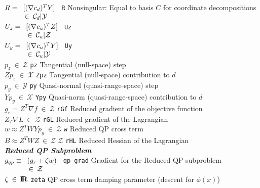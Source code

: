 {\begin{tabbing}
$R = 	\begin{array}[t]{l}
			[ (\nabla c_d)^T Y ] \\
			\:\in\: \mathcal{C}_d|\mathcal{Y}
		\end{array}$
	\> \texttt{R}
		\> Nonsingular:  Equal to basis $C$ for coordinate decompositions\\
$U_z = \begin{array}[t]{l}
			[(\nabla c_u)^T Z] \\
			\:\in\: \mathcal{C}_u|\mathcal{Z}
		\end{array}$
	\> \texttt{Uz}
		\> \\
$U_y = \begin{array}[t]{l}
			[(\nabla c_u)^T Y] \\
			\:\in\: \mathcal{C}_u|\mathcal{Y}
		\end{array}$
	\> \texttt{Uy}
		\> \\
$p_z \:\in\: \mathcal{Z}$
	\> \texttt{pz}
		\> Tangential (null-space) step \\
$Z p_z \:\in\: \mathcal{X}$
	\> \texttt{Zpz}
		\> Tangential (null-space) contribution to $d$ \\
$p_y \:\in\: \mathcal{Y}$
	\> \texttt{py}
		\> Quasi-normal (quasi-range-space) step \\
$Y p_y \:\in\: \mathcal{X}$
	\> \texttt{Ypy}
		\> Quasi-norm (quasi-range-space) contribution to $d$ \\
$g_r = Z^T \nabla f \:\in\: \mathcal{Z}$
	\> \texttt{rGf}
		\> Reduced gradient of the objective function \\
$Z_T \nabla L \:\in\: \mathcal{Z}$
	\> \texttt{rGL}
		\> Reduced gradient of the Lagrangian \\
$w \approx Z^T W Y p_y \:\in\: \mathcal{Z}$
	\> \texttt{w}
		\> Reduced QP cross term \\
$B \approx Z^T W Z  \:\in\: \mathcal{Z}|\mathcal{Z}$
	\> \texttt{rHL}
		\> Reduced Hessian of the Lagrangian \\

\textbf{\textit{Reduced QP Subproblem}} \\
$g_{qp} \equiv
		\begin{array}[t]{l}
			( g_r + \zeta w ) \\
			\:\in\: \mathcal{Z}
		\end{array}$
	\> \texttt{qp\_grad}
		\> Gradient for the Reduced QP subproblem \\
$\zeta \:\in\: \mbox{\textbf{I}}\hspace{-0.6ex}\mbox{\textbf{R}}$
	\> \texttt{zeta}
		\> QP cross term damping parameter (descent for $\phi(x)$) \\


\end{tabbing}}
